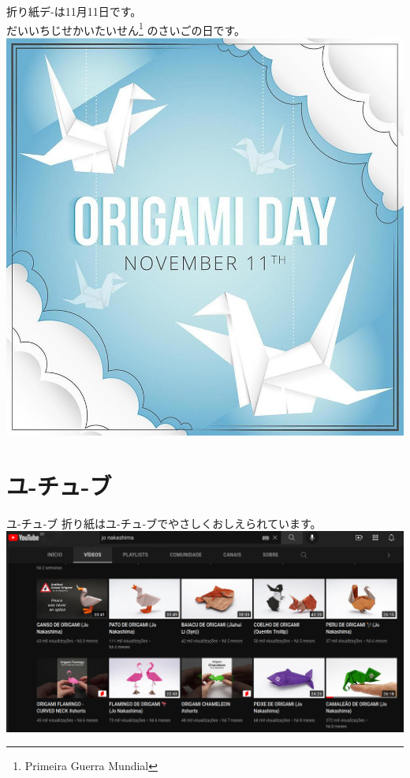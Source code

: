 \documentclass{beamer}
\begin{document}
\begin{frame}

	折り紙デ-は11月11日です。\\
    だいいちじせかいたいせん\footnote{Primeira Guerra Mundial}
    のさいごの日です。
    \center
    \includegraphics[scale=0.2]{c.jpg}
\end{frame}

\section{ユ-チュ-ブ}
\begin{frame}{ユ-チュ-ブ}
	折り紙はユ-チュ-ブでやさしくおしえられています。
	\includegraphics[width=1\textwidth]{b.png}
\end{frame}
\end{document}
